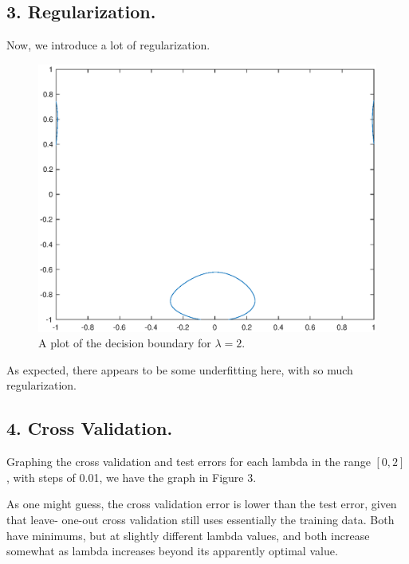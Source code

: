 \documentclass{article}
\begin{document}
\subsection*{3. Regularization.}

Now, we introduce a lot of regularization.

\begin{figure}[h!]
  \includegraphics[scale=.8]{under}
  \caption{A plot of the decision boundary for $\lambda = 2$.}
  \label{Fig 2.}
\end{figure}

As expected, there appears to be some underfitting here, with so much regularization.

\subsection*{4. Cross Validation.}

Graphing the cross validation and test errors for each lambda in the range $[0, 2]$, with steps of 
0.01, we have the graph in Figure 3.

As one might guess, the cross validation error is lower than the test error, given that leave-
one-out cross validation still uses essentially the training data. Both have minimums, but at
slightly different lambda values, and both increase somewhat as lambda increases beyond its
apparently optimal value.
\end{document}
